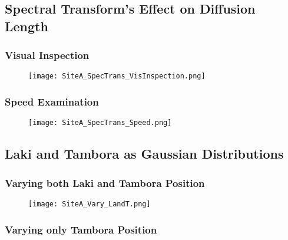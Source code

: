 \documentclass[../../CompleteThesis2/Complete_2ndDraft]{subfiles}
\begin{document}
\subsection[Spectral Transforms]{Spectral Transform's Effect on Diffusion Length}
\label{Subsec:Method_TestStab_SpecTrans}

\subsubsection{Visual Inspection}
\label{Subsubsec:Method_TestStab_SpecTrans_VisInspection}

\begin{figure}[h]
	\centering
	\texttt{[image: SiteA\_SpecTrans\_VisInspection.png]}
	\caption[]{\footnotesize }
	\label{fig:SiteA_SpecTrans_VisInspection}
\end{figure}


\subsubsection{Speed Examination}
\label{Subsubsec:Method_TestStab_SpecTrans_Speed}

\begin{figure}[h]
	\centering
	\texttt{[image: SiteA\_SpecTrans\_Speed.png]}
	\caption[]{\footnotesize }
	\label{fig:SiteA_SpecTrans_Speed}
\end{figure}




\subsection[LT locations]{Laki and Tambora as Gaussian Distributions}
\label{Subsec:Method_TestStab_LTlocations}



\subsubsection[Vary L and T]{Varying both Laki and Tambora Position}
\label{Subsubsec:Method_TestStab_LTlocations_LandT}

\begin{figure}[h]
	\centering
	\texttt{[image: SiteA\_Vary\_LandT.png]}
	\caption[]{\footnotesize }
	\label{fig:SiteA_Vary_LandT}
\end{figure}



\subsubsection[Vary T]{Varying only Tambora Position}
\label{Subsubsec:Method_TestStab_LTlocations_T}
\end{document}
